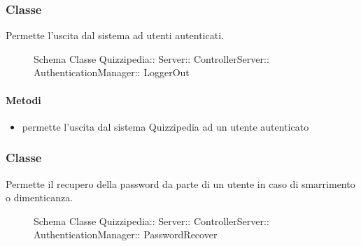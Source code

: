 \subsubsection{Classe }
Permette l'uscita dal sistema ad utenti autenticati.
\begin{figure}[H]
\centering
\noindent{}
\caption[Schema Classe LoggerOut]{Schema Classe Quizzipedia:: Server:: ControllerServer:: AuthenticationManager:: LoggerOut}
\end{figure}
\paragraph{Metodi}
\begin{itemize}
\item {}
\newline
permette l'uscita dal sistema Quizzipedia ad un utente autenticato
\newline
\end{itemize}
\subsubsection{Classe }
Permette il recupero della password da parte di un utente in caso di smarrimento o dimenticanza.
\begin{figure}[H]
\centering
\noindent{}
\caption[Schema Classe PasswordRecover]{Schema Classe Quizzipedia:: Server:: ControllerServer:: AuthenticationManager:: PasswordRecover}
\end{figure}
